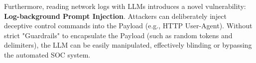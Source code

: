 Furthermore, reading network logs with LLMs introduces a novel vulnerability: \textbf{Log-background Prompt Injection}. Attackers can deliberately inject deceptive control commands into the Payload (e.g., HTTP User-Agent). Without strict "Guardrails" to encapsulate the Payload (such as random tokens and delimiters), the LLM can be easily manipulated, effectively blinding or bypassing the automated SOC system.
